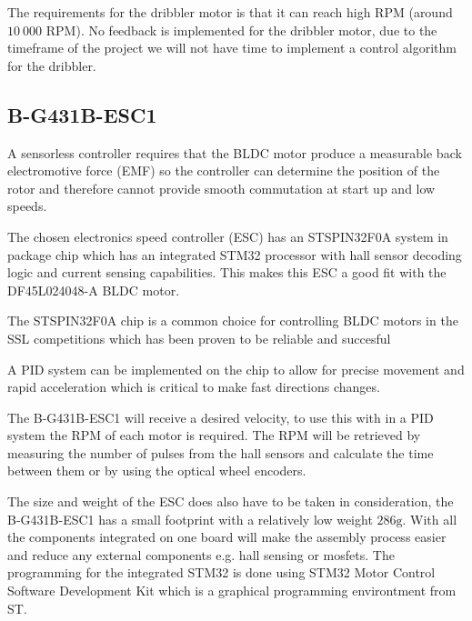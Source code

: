 \documentclass[a4paper,8pt]{article}
\begin{document}
  The requirements for the dribbler motor is that it can reach high RPM
  (around $10\:000\text{ RPM}$). No feedback is implemented for the
  dribbler motor, due to the timeframe of the project we will not have
  time to implement a control algorithm for the dribbler.


  \subsection{B-G431B-ESC1}

  A sensorless controller requires that the BLDC motor produce a
  measurable back electromotive force (EMF) so the controller can
  determine the position of the rotor and therefore cannot provide
  smooth commutation at start up and low speeds.
  \cite{roweInstrumentationControlHigh2012}

  The chosen electronics speed controller (ESC) has an STSPIN32F0A
  system in package chip which has an integrated STM32 processor with
  hall sensor decoding logic and current sensing capabilities. This
  makes this ESC a good fit with the DF45L024048-A BLDC motor.

  The STSPIN32F0A chip is a common choice for controlling BLDC motors in
  the SSL competitions which has been proven to be reliable and
  succesful
  \cite{ryllExtendedTeamDescription}\cite{abousaleh2024TeamDescription}

  A PID system can be implemented on the chip to allow for precise
  movement and rapid acceleration which is critical to make fast
  directions changes.

  The B-G431B-ESC1 will receive a desired velocity, to use this with in
  a PID system the RPM of each motor is required. The RPM will be
  retrieved by measuring the number of pulses from the hall sensors and
  calculate the time between them or by using the optical wheel
  encoders.

  The size and weight of the ESC does also have to be taken in
  consideration, the B-G431B-ESC1 has a small footprint with a
  relatively low weight $286\text{g}$. With all the components
  integrated on one board will make the assembly process easier and
  reduce any external components e.g. hall sensing or mosfets. The
  programming for the integrated STM32 is done using STM32 Motor Control
  Software Development Kit which is a graphical programming environtment
  from ST.
\end{document}
